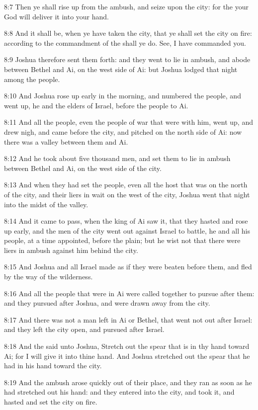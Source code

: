8:7 Then ye shall rise up from the ambush, and seize upon the city: for the \LORD your God will deliver it into your hand.

8:8 And it shall be, when ye have taken the city, that ye shall set the city on fire: according to the commandment of the \LORD shall ye do. See, I have commanded you.

8:9 Joshua therefore sent them forth: and they went to lie in ambush, and abode between Bethel and Ai, on the west side of Ai: but Joshua lodged that night among the people.

8:10 And Joshua rose up early in the morning, and numbered the people, and went up, he and the elders of Israel, before the people to Ai.

8:11 And all the people, even the people of war that were with him, went up, and drew nigh, and came before the city, and pitched on the north side of Ai: now there was a valley between them and Ai.

8:12 And he took about five thousand men, and set them to lie in ambush between Bethel and Ai, on the west side of the city.

8:13 And when they had set the people, even all the host that was on the north of the city, and their liers in wait on the west of the city, Joshua went that night into the midst of the valley.

8:14 And it came to pass, when the king of Ai saw it, that they hasted and rose up early, and the men of the city went out against Israel to battle, he and all his people, at a time appointed, before the plain; but he wist not that there were liers in ambush against him behind the city.

8:15 And Joshua and all Israel made as if they were beaten before them, and fled by the way of the wilderness.

8:16 And all the people that were in Ai were called together to pursue after them: and they pursued after Joshua, and were drawn away from the city.

8:17 And there was not a man left in Ai or Bethel, that went not out after Israel: and they left the city open, and pursued after Israel.

8:18 And the \LORD said unto Joshua, Stretch out the spear that is in thy hand toward Ai; for I will give it into thine hand. And Joshua stretched out the spear that he had in his hand toward the city.

8:19 And the ambush arose quickly out of their place, and they ran as soon as he had stretched out his hand: and they entered into the city, and took it, and hasted and set the city on fire.

